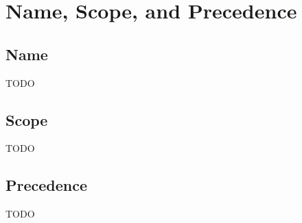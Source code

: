 \chapter{Name, Scope, and Precedence}

\section{Name}\label{sec:name}
TODO

\section{Scope}\label{sec:scope}
TODO

\section{Precedence}\label{sec:precedence}
TODO
